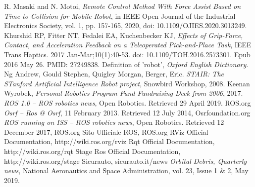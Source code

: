 \documentclass[noexaminfo,oneside,binding=0.6cm]{sapthesis}
\begin{document}
\begin{thebibliography}{bibl}
		R. Masaki and N. Motoi, 	\emph{Remote Control Method With Force Assist Based on Time to Collision for Mobile Robot}, in IEEE Open Journal of the Industrial Electronics Society, vol. 1, pp. 157-165, 2020, doi: 10.1109/OJIES.2020.3013249.
		Khurshid RP, Fitter NT, Fedalei EA, Kuchenbecker KJ, \emph{Effects of Grip-Force, Contact, and Acceleration Feedback on a Teleoperated Pick-and-Place Task}, IEEE Trans Haptics. 2017 Jan-Mar;10(1):40-53. doi: 10.1109/TOH.2016.2573301. Epub 2016 May 26. PMID: 27249838.
		Definition of 'robot', \emph{Oxford English Dictionary}.
		Ng Andrew, Gould
		Stephen, Quigley Morgan, Berger, Eric. \emph{STAIR: The
		STanford Artificial Intelligence Robot project}, Snowbird Workshop, 2008.
		Keenan Wyrobek,
		\emph{Personal Robotics Program Fund Fundraising Deck from 2006}, 2017.
		\emph{ROS 1.0 – ROS robotics news}, Open Robotics. Retrieved 29 April 2019. ROS.org
		\emph{Osrf – Ros @ Osrf}, 11 February 2013. Retrieved 12 July 2014, Osrfoundation.org
		\emph{ROS running on ISS – ROS robotics news}, Open Robotics. Retrieved 12 December 2017, ROS.org
		Sito Ufficiale ROS, ROS.org
		RViz Official Documentation, 	http://wiki.ros.org/rviz
		Rqt Official Documentation, 	http://wiki.ros.org/rqt
		Stage Ros Official Documentation, 	http://wiki.ros.org/stage
		Sicurauto, sicurauto.it/news
		\emph{Orbital Debris, Quarterly news}, National Aeronautics and Space Administration, vol. 23, Issue 1 \& 2, May 2019.
		
	\end{thebibliography}
	
\end{document}
